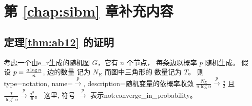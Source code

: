 \chapter{第 \ref{chap:sibm} 章补充内容}
\section{定理\ref{thm:ab12} 的证明}
\begin{lemma}\label{lem:ER_tr_counting}
  考虑一个由\gls{e_r}生成的随机图 $G$，它有  $n$
  个节点， 每条边以概率 $p$ 随机生成\cite{erdHos1960evolution}。
   假设
	$p=\frac{a \log n}{n}$, 边的数量
  记为  $N_E$ 
  而图中三角形的
  数量记为  $T$。 则
{
  type=notation,
  name={$\xrightarrow{p}$},
  description={随机变量的依概率收敛}
}
	$\frac{N_E}{n \log n} \xrightarrow{p} \frac{a}{2}$ 且
  $\frac{T}{\log^3 n} \xrightarrow{p} \frac{a^3}{6}$。
  这里, 符号 $\xrightarrow{p}$ 表示\glsdesc{not:converge_in_probability}。
\end{lemma}
